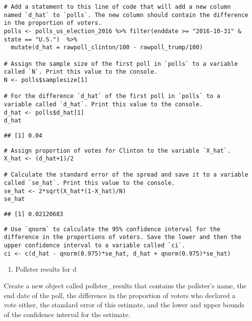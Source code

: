 \documentclass[
]{article}
\providecommand{\tightlist}{%
  \setlength{\itemsep}{0pt}\setlength{\parskip}{0pt}}
\begin{document}
\begin{verbatim}
# Add a statement to this line of code that will add a new column named `d_hat` to `polls`. The new column should contain the difference in the proportion of voters.
polls <- polls_us_election_2016 %>% filter(enddate >= "2016-10-31" & state == "U.S.")  %>%
  mutate(d_hat = rawpoll_clinton/100 - rawpoll_trump/100)

# Assign the sample size of the first poll in `polls` to a variable called `N`. Print this value to the console.
N <- polls$samplesize[1]

# For the difference `d_hat` of the first poll in `polls` to a variable called `d_hat`. Print this value to the console.
d_hat <- polls$d_hat[1]
d_hat
\end{verbatim}

\begin{verbatim}
## [1] 0.04
\end{verbatim}

\begin{verbatim}
# Assign proportion of votes for Clinton to the variable `X_hat`.
X_hat <- (d_hat+1)/2

# Calculate the standard error of the spread and save it to a variable called `se_hat`. Print this value to the console.
se_hat <- 2*sqrt(X_hat*(1-X_hat)/N)
se_hat
\end{verbatim}

\begin{verbatim}
## [1] 0.02120683
\end{verbatim}

\begin{verbatim}
# Use `qnorm` to calculate the 95% confidence interval for the difference in the proportions of voters. Save the lower and then the upper confidence interval to a variable called `ci`.
ci <- c(d_hat - qnorm(0.975)*se_hat, d_hat + qnorm(0.975)*se_hat)
\end{verbatim}

\begin{enumerate}
\def\labelenumi{\arabic{enumi}.}
\setcounter{enumi}{5}
\tightlist
\item
  Pollster results for d
\end{enumerate}

Create a new object called pollster\_results that contains the
pollster's name, the end date of the poll, the difference in the
proportion of voters who declared a vote either, the standard error of
this estimate, and the lower and upper bounds of the confidence interval
for the estimate.
\end{document}
